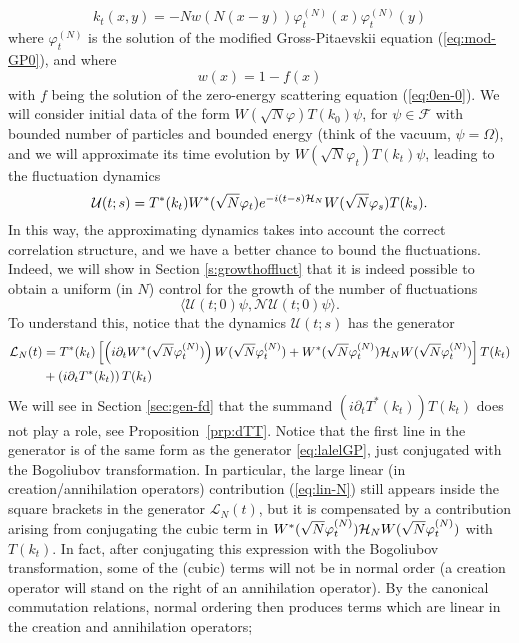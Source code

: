 \documentclass[11pt,a4paper]{article}
\newcommand{\cU}{{\cal U}}
\newcommand{\cH}{{\cal H}}
\newcommand{\cL}{{\cal L}}
\newcommand{\fock}{\mathcal{F}}		%
\newcommand{\Lcal}{\mathcal{L}}		%
\newcommand{\Ncal}{\mathcal{N}}		%
\begin{document}
\begin{equation}\label{eq:kt-def0} k_t (x,y) = - N w (N(x-y)) \varphi^{(N)}_t (x) \varphi^{(N)}_t (y) \end{equation}
where $\varphi^{(N)}_t$ is the solution of the modified Gross-Pitaevskii equation (\ref{eq:mod-GP0}), and where
\[ w (x) = 1 - f(x) \]
with $f$ being the solution of the zero-energy scattering equation (\ref{eq:0en-0}). We will consider initial data of the form $W(\sqrt{N} \varphi) T(k_0) \psi$, for $\psi \in \fock$ with bounded number of particles and bounded energy (think of the vacuum, $\psi = \Omega$), and we will approximate its time evolution by $W(\sqrt{N} \varphi_t) T(k_t) \psi$, leading to the fluctuation dynamics 
\begin{equation}\label{eq:cU-0} \cU (t;s) = T^* (k_t) W^* (\sqrt{N}
\varphi_t) e^{-i(t-s) \cH_N} W(\sqrt{N} \varphi_s) T(k_s). \end{equation}
In this way, the approximating dynamics takes into account the correct correlation structure, and we have a better chance to bound the fluctuations. Indeed, we will show in Section \ref{s:growthoffluct} that it is indeed possible to obtain a uniform (in $N$) control for the growth of the number of fluctuations
\[\langle \mathcal{U}(t;0)\psi,\Ncal \mathcal{U}(t;0)\psi\rangle.\]
To understand this, notice that the dynamics $\mathcal{U}(t;s)$ has the generator
\[\begin{split}
\cL_N (t) & =  T^* (k_t) \left[\left( i \partial_t W^* (\sqrt{N} \varphi_t^{(N)}) \right) W(\sqrt{N} \varphi_t^{(N)}) + W^* (\sqrt{N} \varphi_t^{(N)}) \cH_N W (\sqrt{N} \varphi_t^{(N)})\right] T (k_t)\\
 & + \left( i \partial_t T^* (k_t) \right) T(k_t)
\end{split} \]
We will see in Section \ref{sec:gen-fd} that the summand $\left( i \partial_t T^* (k_t) \right) T(k_t)$ does not play a role, see Proposition~\ref{prp:dTT}. Notice that the first line in the generator is of the same form as the generator \eqref{eq:lalelGP}, just conjugated with the Bogoliubov transformation. In particular, the large linear (in creation/annihilation operators) contribution (\ref{eq:lin-N}) still appears inside the square brackets in the generator $\Lcal_N(t)$, but it is compensated by a contribution arising from conjugating the cubic term in $W^* (\sqrt{N} \varphi_t^{(N)}) \cH_N W(\sqrt{N} \varphi_t^{(N)})$ with $T(k_t)$. In fact, after conjugating this expression with the Bogoliubov transformation, some of the (cubic) terms will not be in normal order (a creation operator will stand on the right of an annihilation operator). By the canonical commutation relations, normal ordering then produces terms which are linear in the creation and annihilation operators; 
\end{document}
